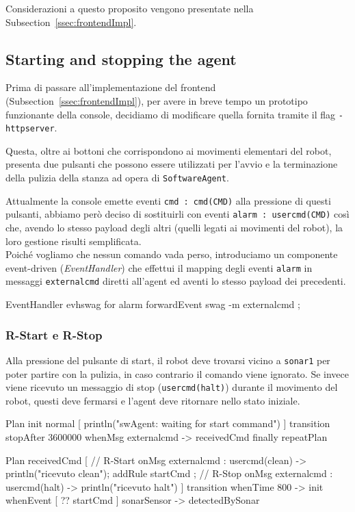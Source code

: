 \documentclass{../llncs}
\newcommand{\codescript}[1]{{\mbox{\small{\texttt{#1}}}}\xspace}
\newcommand{\code}[1]{{\color{blue}\small{\texttt{#1}}}}
\newcommand{\xss}[1]{\subsectionname~\ref{ssec:#1}}
\newcommand{\subsectionname}{Subsection}
\begin{document}
Considerazioni a questo proposito vengono presentate nella \xss{frontendImpl}.

\subsection{Starting and stopping the agent}
Prima di passare all'implementazione del frontend (\xss{frontendImpl}), per avere in breve tempo un prototipo funzionante della console, decidiamo di modificare quella fornita tramite il flag \codescript{-httpserver}.

Questa, oltre ai bottoni che corrispondono ai movimenti elementari del robot, presenta due pulsanti che possono essere utilizzati per l'avvio e la terminazione della pulizia della stanza ad opera di \texttt{SoftwareAgent}.

Attualmente la console emette eventi \codescript{cmd : cmd(CMD)} alla pressione di questi pulsanti, abbiamo però deciso di sostituirli con eventi \codescript{alarm : usercmd(CMD)} così che, avendo lo stesso payload degli altri (quelli legati ai movimenti del robot), la loro gestione risulti semplificata.\\

Poiché vogliamo che nessun comando vada perso, introduciamo un componente event-driven (\emph{EventHandler}) che effettui il mapping degli eventi \codescript{alarm} in messaggi \codescript{externalcmd} diretti all'agent ed aventi lo stesso payload dei precedenti.\\

\begin{qacode}[caption={cleaningRobotSystem.qa}]
EventHandler evhswag for alarm {
	forwardEvent swag -m externalcmd
};
\end{qacode}

\subsubsection{R-Start e R-Stop}
Alla pressione del pulsante di start, il robot deve trovarsi vicino a \code{sonar1} per poter partire con la pulizia, in caso contrario il comando viene ignorato. Se invece viene ricevuto un messaggio di stop (\codescript{usercmd(halt)}) durante il movimento del robot, questi deve fermarsi e l'agent deve ritornare nello stato iniziale.\\

\begin{qacode}[caption={SoftwareAgent, pt1}]
Plan init normal [
   	println("swAgent: waiting for start command")
]
transition stopAfter 3600000
	whenMsg externalcmd -> receivedCmd
finally repeatPlan

Plan receivedCmd [
	// R-Start
	onMsg externalcmd : usercmd(clean) -> {
   		println("ricevuto clean");
   		addRule startCmd
	};
	// R-Stop
   	onMsg externalcmd : usercmd(halt) -> println("ricevuto halt")
]
transition
	whenTime 800 -> init
	whenEvent [ ?? startCmd ] sonarSensor -> detectedBySonar
\end{qacode}
\end{document}
